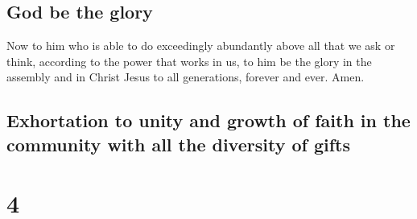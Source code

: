 \hypertarget{god-be-the-glory}{%
\subsection{God be the glory}\label{god-be-the-glory}}

 Now to him who is able to do exceedingly abundantly
above all that we ask or think, according to the power that works in us,
 to him be the glory in the assembly and in Christ Jesus
to all generations, forever and ever. Amen.

\hypertarget{exhortation-to-unity-and-growth-of-faith-in-the-community-with-all-the-diversity-of-gifts}{%
\subsection{Exhortation to unity and growth of faith in the community
with all the diversity of
gifts}\label{exhortation-to-unity-and-growth-of-faith-in-the-community-with-all-the-diversity-of-gifts}}

\hypertarget{section-3}{%
\section{4}\label{section-3}}

